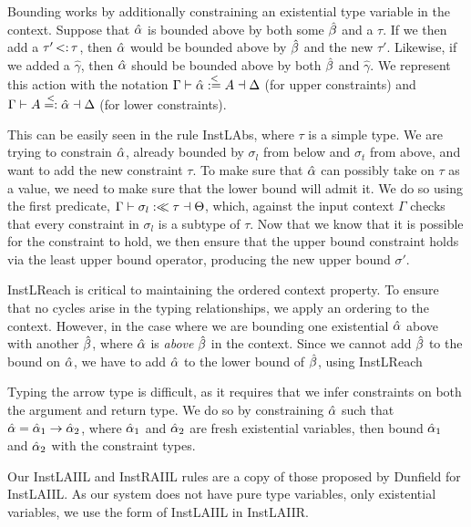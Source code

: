 \documentclass{sig-alternate}
\begin{document}
\begin{figure}[h]
\small

\end{figure}

Bounding works by additionally constraining an existential type variable in the context. Suppose that $\hat{\alpha}$ is bounded above by both some $\hat{\beta}$ and a $\tau$. If we then add a $\tau' \st \tau$, then $\hat{\alpha}$ would be bounded above by $\hat{\beta}$ and the new $\tau'$. Likewise, if we added a $\hat{\gamma}$, then $\hat{\alpha}$ should be bounded above by both $\hat{\beta}$ and $\hat{\gamma}$. We represent this action with the notation $\Gamma \vdash \hat{\alpha} \overset{<}{:=} A \dashv \Delta$ (for upper constraints) and $\Gamma \vdash A \overset{<}{=:} \hat{\alpha} \dashv \Delta$ (for lower constraints).

This can be easily seen in the rule InstLAbs, where $\tau$ is a simple type. We are trying to constrain $\hat{\alpha}$, already bounded by $\sigma_l$ from below and $\sigma_t$ from above, and want to add the new constraint $\tau$. To make sure that $\hat{\alpha}$ can possibly take on $\tau$ as a value, we need to make sure that the lower bound will admit it. We do so using the first predicate, $\Gamma \vdash \sigma_l :\ll \tau \dashv \Theta$, which, against the input context $\Gamma$ checks that every constraint in $\sigma_l$ is a subtype of $\tau$. Now that we know that it is possible for the constraint to hold, we then ensure that the upper bound constraint holds via the least upper bound operator, producing the new upper bound $\sigma'$.

InstLReach is critical to maintaining the ordered context property. To ensure that no cycles arise in the typing relationships, we apply an ordering to the context. However, in the case where we are bounding one existential $\hat{\alpha}$ above with another $\hat{\beta}$, where $\hat{\alpha}$ is \emph{above} $\hat{\beta}$ in the context. Since we cannot add $\hat{\beta}$ to the bound on $\hat{\alpha}$, we have to add $\hat{\alpha}$ to the lower bound of $\hat{\beta}$, using InstLReach

Typing the arrow type is difficult, as it requires that we infer constraints on both the argument and return type. We do so by constraining $\hat{\alpha}$ such that $\hat{\alpha} = \hat{\alpha}_1 \rightarrow \hat{\alpha}_2$, where $\hat{\alpha}_1$ and $\hat{\alpha}_2$ are fresh existential variables, then bound $\hat{\alpha}_1$ and $\hat{\alpha}_2$ with the constraint types.

Our InstLAIIL and InstRAIIL rules are a copy of those proposed by Dunfield for InstLAIIL. As our system does not have pure type variables, only existential variables, we use the form of InstLAIIL in InstLAIIR.
\end{document}
